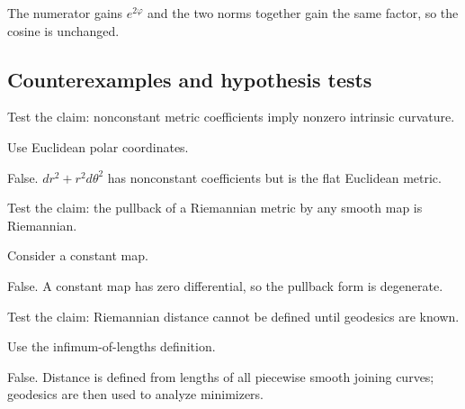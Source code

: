 \begin{solution}
The numerator gains \(e^{2\varphi}\) and the two norms together gain the same factor, so the cosine is unchanged.
\end{solution}

\subsection*{Counterexamples and hypothesis tests}

\begin{exercise}\label{exr:vii20-ped-10}
Test the claim: nonconstant metric coefficients imply nonzero intrinsic curvature.
\end{exercise}

\begin{hint}
Use Euclidean polar coordinates.
\end{hint}

\begin{solution}
False.  \(dr^2+r^2d\theta^2\) has nonconstant coefficients but is the flat Euclidean metric.
\end{solution}

\begin{exercise}\label{exr:vii20-ped-11}
Test the claim: the pullback of a Riemannian metric by any smooth map is Riemannian.
\end{exercise}

\begin{hint}
Consider a constant map.
\end{hint}

\begin{solution}
False.  A constant map has zero differential, so the pullback form is degenerate.
\end{solution}

\begin{exercise}\label{exr:vii20-ped-12}
Test the claim: Riemannian distance cannot be defined until geodesics are known.
\end{exercise}

\begin{hint}
Use the infimum-of-lengths definition.
\end{hint}

\begin{solution}
False.  Distance is defined from lengths of all piecewise smooth joining curves; geodesics are then used to analyze minimizers.
\end{solution}

